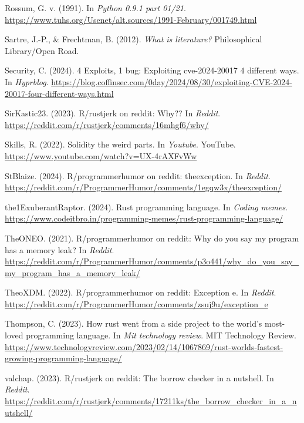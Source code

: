 \documentclass[11pt]{article}
\begin{document}
\begin{hangparas}{1.5em}{1}
\hypertarget{citeproc_bib_item_31}{Rossum, G. v. (1991). In \textit{Python 0.9.1 part 01/21}. \url{https://www.tuhs.org/Usenet/alt.sources/1991-February/001749.html}}

\hypertarget{citeproc_bib_item_32}{Sartre, J.-P., \& Frechtman, B. (2012). \textit{What is literature?} Philosophical Library/Open Road.}

\hypertarget{citeproc_bib_item_33}{Security, C. (2024). 4 Exploits, 1 bug: Exploiting cve-2024-20017 4 different ways. In \textit{Hyprblog}. \url{https://blog.coffinsec.com/0day/2024/08/30/exploiting-CVE-2024-20017-four-different-ways.html}}

\hypertarget{citeproc_bib_item_34}{SirKastic23. (2023). R/rustjerk on reddit: Why?? In \textit{Reddit}. \url{https://reddit.com/r/rustjerk/comments/16mhgf6/why/}}

\hypertarget{citeproc_bib_item_35}{Skills, R. (2022). Solidity the weird parts. In \textit{Youtube}. YouTube. \url{https://www.youtube.com/watch?v=UX-4rAXFvWw}}

\hypertarget{citeproc_bib_item_36}{StBlaize. (2024). R/programmerhumor on reddit: theexception. In \textit{Reddit}. \url{https://reddit.com/r/ProgrammerHumor/comments/1egqw3x/theexception/}}

\hypertarget{citeproc_bib_item_37}{the1ExuberantRaptor. (2024). Rust programming language. In \textit{Coding memes}. \url{https://www.codeitbro.in/programming-memes/rust-programming-language/}}

\hypertarget{citeproc_bib_item_38}{TheONEO. (2021). R/programmerhumor on reddit: Why do you say my program has a memory leak? In \textit{Reddit}. \url{https://reddit.com/r/ProgrammerHumor/comments/p3o441/why_do_you_say_my_program_has_a_memory_leak/}}

\hypertarget{citeproc_bib_item_39}{TheoXDM. (2022). R/programmerhumor on reddit: Exception e. In \textit{Reddit}. \url{https://reddit.com/r/ProgrammerHumor/comments/zsuj9u/exception_e}}

\hypertarget{citeproc_bib_item_40}{Thompson, C. (2023). How rust went from a side project to the world’s most-loved programming language. In \textit{Mit technology review}. MIT Technology Review. \url{https://www.technologyreview.com/2023/02/14/1067869/rust-worlds-fastest-growing-programming-language/}}

\hypertarget{citeproc_bib_item_41}{valchap. (2023). R/rustjerk on reddit: The borrow checker in a nutshell. In \textit{Reddit}. \url{https://reddit.com/r/rustjerk/comments/17211ks/the_borrow_checker_in_a_nutshell/}}


\end{hangparas}
\end{document}
